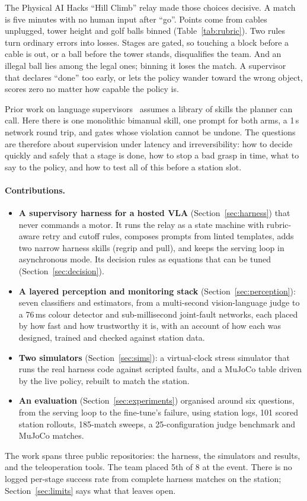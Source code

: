 \documentclass[10pt]{article}
\begin{document}
The Physical AI Hacks ``Hill Climb'' relay made those choices decisive. A match is five minutes with no human
input after ``go''. Points come from cables unplugged, tower height and golf balls binned (Table~\ref{tab:rubric}).
Two rules turn ordinary errors into losses. Stages are gated, so touching a block before a cable is out, or a ball
before the tower stands, disqualifies the team. And an illegal ball lies among the legal ones; binning it loses the
match. A supervisor that declares ``done'' too early, or lets the policy wander toward the wrong object, scores
zero no matter how capable the policy is.

Prior work on language supervisors~\cite{ahn2022saycan,huang2022inner,liang2023code} assumes a library of skills the
planner can call. Here there is one monolithic bimanual skill, one prompt for both arms, a 1\,s network round trip,
and gates whose violation cannot be undone. The questions are therefore about supervision under latency and
irreversibility: how to decide quickly and safely that a stage is done, how to stop a bad grasp in time, what to say
to the policy, and how to test all of this before a station slot.

\paragraph{Contributions.}
\begin{itemize}
  \item \textbf{A supervisory harness for a hosted VLA} (Section~\ref{sec:harness}) that never commands a motor. It
  runs the relay as a state machine with rubric-aware retry and cutoff rules, composes prompts from linted templates,
  adds two narrow harness skills (regrip and pull), and keeps the serving loop in asynchronous mode. Its
  decision rules as equations that can be tuned (Section~\ref{sec:decision}).
  \item \textbf{A layered perception and monitoring stack} (Section~\ref{sec:perception}): seven classifiers and
  estimators, from a multi-second vision-language judge to a 76\,ms colour detector and sub-millisecond joint-fault
  networks, each placed by how fast and how trustworthy it is, with an account of how each was designed, trained and checked
  against station data.
  \item \textbf{Two simulators} (Section~\ref{sec:sims}): a virtual-clock stress simulator that runs the real harness
  code against scripted faults, and a MuJoCo table driven by the live policy, rebuilt to match the station.
  \item \textbf{An evaluation} (Section~\ref{sec:experiments}) organised around six questions, from the serving loop to
  the fine-tune's failure, using station logs, 101 scored station rollouts, 185-match sweeps, a 25-configuration judge
  benchmark and MuJoCo matches.
\end{itemize}
The work spans three public repositories: the harness, the simulators and results, and the teleoperation tools. The team
placed 5th of 8 at the event. There is
no logged per-stage success rate from complete harness matches on the station; Section~\ref{sec:limits} says what that
leaves open.
\end{document}
